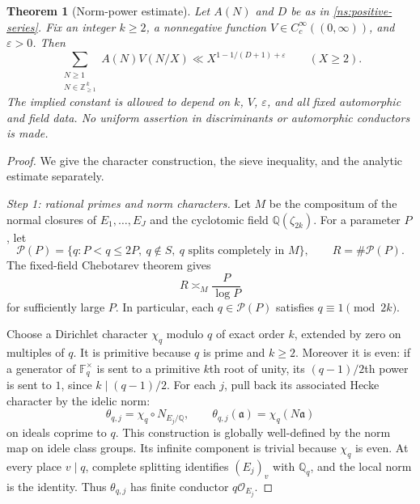 \documentclass[11pt,reqno]{amsart}
\numberwithin{equation}{section}
\newtheorem{theorem}{Theorem}[section]
\theoremstyle{definition}
\theoremstyle{remark}
\newcommand{\Q}{\mathbb Q}
\begin{document}
\begin{theorem}[Norm-power estimate]\label{ns:norm-power}
Let $A(N)$ and $D$ be as in \eqref{ns:positive-series}. Fix an integer $k\ge2$, a nonnegative function $V\in C_c^\infty((0,\infty))$, and $\varepsilon>0$. Then
\begin{equation}\label{ns:norm-power-bound}
\sum_{\substack{N\ge1\\N\in\mathbb Z_{\ge1}^{\,k}}}A(N)V(N/X)
\ll X^{1-1/(D+1)+\varepsilon}\qquad(X\ge2).
\end{equation}
The implied constant is allowed to depend on $k$, $V$, $\varepsilon$, and all fixed automorphic and field data. No uniform assertion in discriminants or automorphic conductors is made.
\end{theorem}

\begin{proof}
We give the character construction, the sieve inequality, and the analytic estimate separately.

\emph{Step 1: rational primes and norm characters.}
Let $M$ be the compositum of the normal closures of $E_1,\ldots,E_J$ and the cyclotomic field $\Q(\zeta_{2k})$. For a parameter $P$, let
\begin{equation}\label{ns:sieving-primes}
\mathcal P(P)=\{q:P<q\le2P,\ q\notin S,\ q\text{ splits completely in }M\},
\qquad R=\#\mathcal P(P).
\end{equation}
The fixed-field Chebotarev theorem gives
\begin{equation}\label{ns:prime-count}
R\asymp_{M}\frac{P}{\log P}
\end{equation}
for sufficiently large $P$. In particular, each $q\in\mathcal P(P)$ satisfies $q\equiv1\pmod{2k}$.

Choose a Dirichlet character $\chi_q$ modulo $q$ of exact order $k$, extended by zero on multiples of $q$. It is primitive because $q$ is prime and $k\ge2$. Moreover it is even: if a generator of $\mathbb F_q^\times$ is sent to a primitive $k$th root of unity, its $(q-1)/2$th power is sent to $1$, since $k\mid(q-1)/2$. For each $j$, pull back its associated Hecke character by the idelic norm:
\begin{equation}\label{ns:norm-character}
\theta_{q,j}=\chi_q\circ N_{E_j/\Q},\qquad
\theta_{q,j}(\mathfrak a)=\chi_q(N\mathfrak a)
\end{equation}
on ideals coprime to $q$. This construction is globally well-defined by the norm map on idele class groups. Its infinite component is trivial because $\chi_q$ is even. At every place $v\mid q$, complete splitting identifies $(E_j)_v$ with $\Q_q$, and the local norm is the identity. Thus $\theta_{q,j}$ has finite conductor $q\mathcal O_{E_j}$.


\end{proof}
\end{document}
